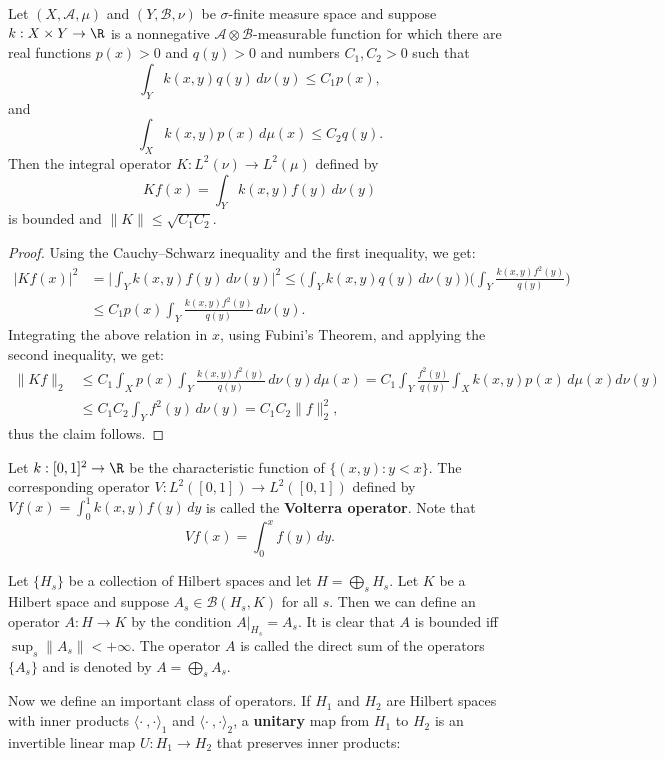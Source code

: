 \begin{proposition}\label{Hilbert space integration operator}
Let $(X,\mathcal{A},\mu)$ and $(Y,\mathcal{B},\nu)$ be $\sigma$-finite measure space and suppose $k:X\times Y\to\R$ is a nonnegative $\mathcal{A}\otimes\mathcal{B}$-measurable function for which there are real functions $p(x)>0$ and $q(y)>0$ and numbers $C_1,C_2>0$ such that
\[\int_Yk(x,y)q(y)\,d\nu(y)\leq C_1p(x),\]
and
\[\int_Xk(x,y)p(x)\,d\mu(x)\leq C_2q(y).\]
Then the integral operator $K:L^2(\nu)\to L^2(\mu)$ defined by
\[Kf(x)=\int_Yk(x,y)f(y)\,d\nu(y)\]
is bounded and $\|K\|\leq\sqrt{C_1C_2}$.
\end{proposition}
\begin{proof}
Using the Cauchy–Schwarz inequality and the first inequality, we get:
\begin{align*}
|Kf(x)|^2&=\Big|\int_Yk(x,y)f(y)\,d\nu(y)\Big|^2\leq\Big(\int_Yk(x,y)q(y)\,d\nu(y)\Big)\Big(\int_Y\frac{k(x,y)f^2(y)}{q(y)}\Big)\\
&\leq C_1p(x)\int_Y\frac{k(x,y)f^2(y)}{q(y)}\,d\nu(y).
\end{align*}
Integrating the above relation in $x$, using Fubini's Theorem, and applying the second inequality, we get:
\begin{align*}
\|Kf\|_2&\leq C_1\int_Xp(x)\int_Y\frac{k(x,y)f^2(y)}{q(y)}\,d\nu(y)d\mu(x)=C_1\int_Y\frac{f^2(y)}{q(y)}\int_Xk(x,y)p(x)\,d\mu(x)d\nu(y)\\
&\leq C_1C_2\int_Yf^2(y)\,d\nu(y)=C_1C_2\|f\|_2^2,
\end{align*}
thus the claim follows.
\end{proof}
\begin{example}
Let $k:[0,1]^2\to\R$ be the characteristic function of $\{(x,y):y<x\}$. The corresponding operator $V:L^2([0,1])\to L^2([0,1])$ defined by $Vf(x)=\int_{0}^{1}k(x,y)f(y)\,dy$ is called the \textbf{Volterra operator}. Note that
\[Vf(x)=\int_0^xf(y)\,dy.\]
\end{example}
\begin{example}
Let $\{H_s\}$ be a collection of Hilbert spaces and let $H=\bigoplus_sH_s$. Let $K$ be a Hilbert space and suppose $A_s\in\mathcal{B}(H_s,K)$ for all $s$. Then we can define an operator $A:H\to K$ by the condition $A|_{H_s}=A_s$. It is clear that $A$ is bounded iff $\sup_s\|A_s\|<+\infty$. The operator $A$ is called the direct sum of the operators $\{A_s\}$ and is denoted by $A=\bigoplus_sA_s$.
\end{example}
Now we define an important class of operators. If $H_1$ and $H_2$ are Hilbert spaces with inner products $\langle\cdot\ ,\cdot\rangle_1$ and $\langle\cdot\ ,\cdot\rangle_2$, a \textbf{unitary} map from $H_1$ to $H_2$ is an invertible linear map $U:H_1\to H_2$ that preserves inner products:
